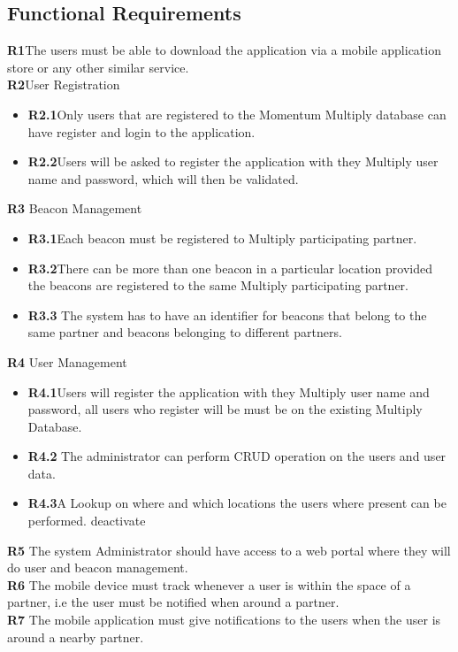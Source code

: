 \documentclass[11pt]{article}
\begin{document}
\subsection{Functional Requirements}
\textbf{R1}The users must be able to download the application via a mobile application store or any other similar service.\\
\textbf{R2}User Registration
\begin{itemize}	
	\item \textbf{R2.1}Only users that are registered to the Momentum Multiply database can have register and login to the application.
	\item \textbf{R2.2}Users will be asked to register the application with they Multiply user name and password, which will then be validated.
\end{itemize}
\textbf{R3} Beacon Management
\begin{itemize}	
	\item \textbf{R3.1}Each beacon must be registered to Multiply participating partner.
	\item 	\textbf{R3.2}There can be more than one beacon in a particular location provided the beacons are registered to the same Multiply participating partner.
	\item \textbf{R3.3} The system has to have an identifier for beacons that belong to the same partner and beacons belonging to different partners.	
\end{itemize}
\textbf{R4} User Management
\begin{itemize}	
	\item \textbf{R4.1}Users will register the application with they Multiply user name and password, all users who register will be must be on the existing Multiply Database. 
	\item \textbf{R4.2} The administrator can perform CRUD operation on the users and user data. 
	\item \textbf{R4.3}A Lookup on where and which locations the users where present can be performed.
	 deactivate 
\end{itemize}
\textbf{R5} The system Administrator should have access to a web portal where they will do user and beacon management. \\
\textbf{R6} The mobile device must track whenever a user is within the space of a partner, i.e the user must be notified when around a partner. \\
\textbf{R7} The mobile application must give notifications to the users when the user is around a nearby partner. \\
\end{document}
